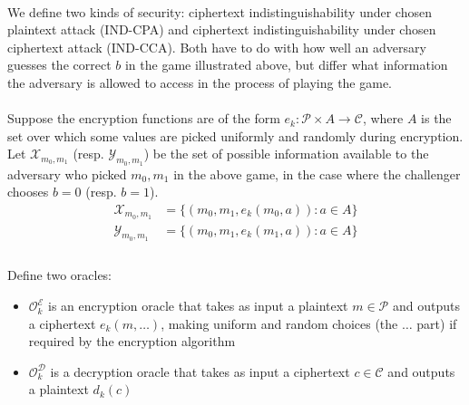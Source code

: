 
\paragraph{}
We define two kinds of security: ciphertext indistinguishability under chosen plaintext attack (IND-CPA) and ciphertext indistinguishability under chosen ciphertext attack (IND-CCA). Both have to do with how well an adversary guesses the correct $b$ in the game illustrated above, but differ what information the adversary is allowed to access in the process of playing the game.

\paragraph{}
Suppose the encryption functions are of the form $e_k: \mathcal{P} \times A \rightarrow \mathcal{C}$, where $A$ is the set over which some values are picked uniformly and randomly during encryption. Let $\mathcal{X}_{m_0, m_1}$ (resp. $\mathcal{Y}_{m_0, m_1}$) be the set of possible information available to the adversary who picked $m_0, m_1$ in the above game, in the case where the challenger chooses $b = 0$ (resp. $b = 1$).
\begin{align*}
\mathcal{X}_{m_0, m_1} &= \{ (m_0, m_1, e_k(m_0, a)) : a \in A \}\\
\mathcal{Y}_{m_0, m_1} &= \{ (m_0, m_1, e_k(m_1, a)) : a \in A \}\\
\end{align*}

\paragraph{}
Define two oracles:
\begin{itemize}
    \item $\mathcal{O}_k^\mathcal{E}$ is an encryption oracle that takes as input a plaintext $m \in \mathcal{P}$ and outputs a ciphertext $e_k(m, \dots)$, making uniform and random choices (the $\dots$ part) if required by the encryption algorithm
    \item $\mathcal{O}_k^\mathcal{D}$ is a decryption oracle that takes as input a ciphertext $c \in \mathcal{C}$ and outputs a plaintext $d_k(c)$
\end{itemize}

